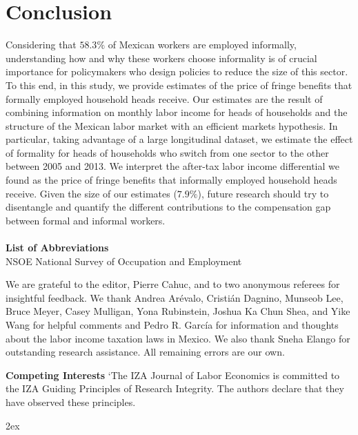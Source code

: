 \documentclass{svjour3}                     %
\begin{document}
\section{Conclusion} \label{section:finalcomments}
\noindent Considering that $58.3\%$ of Mexican workers are employed informally, understanding how and why these workers choose informality is of crucial importance for policymakers who design policies to reduce the size of this sector. To this end, in this study, we provide estimates of the price of fringe benefits that formally employed household heads receive. Our estimates are the result of combining information on monthly labor income for heads of households and the structure of the Mexican labor market with an efficient markets hypothesis. In particular, taking advantage of a large longitudinal dataset, we estimate the effect of formality for heads of households who switch from one sector to the other between 2005 and 2013. We interpret the after-tax labor income differential we found as the price of fringe benefits that informally employed household heads receive. Given the size of our estimates ($7.9\%$), future research should try to disentangle and quantify the different contributions to the compensation gap between formal and informal workers. \\ \\


\noindent \textbf{List of Abbreviations} \\
NSOE \indent National Survey of Occupation and Employment

\begin{acknowledgements}
We are grateful to the editor, Pierre Cahuc, and to two anonymous referees for insightful feedback. We thank  Andrea Ar\'{e}valo, Cristi\'{a}n Dagnino, Munseob Lee, Bruce Meyer, Casey Mulligan, Yona Rubinstein, Joshua Ka Chun Shea, and Yike Wang for helpful comments and Pedro R. Garc\'{i}a for information and thoughts about the labor income taxation laws in Mexico. We also thank Sneha Elango for outstanding research assistance. All remaining errors are our own.
\end{acknowledgements}

\small
\noindent \textbf{Competing Interests} ‘The IZA Journal of Labor
Economics is committed to the IZA Guiding
Principles of Research Integrity. The authors declare
that they have observed these principles.

\begingroup
\parindent 0pt
\parskip 2ex
\def\enotesize{\normalsize}
\theendnotes
\endgroup
\end{document}
